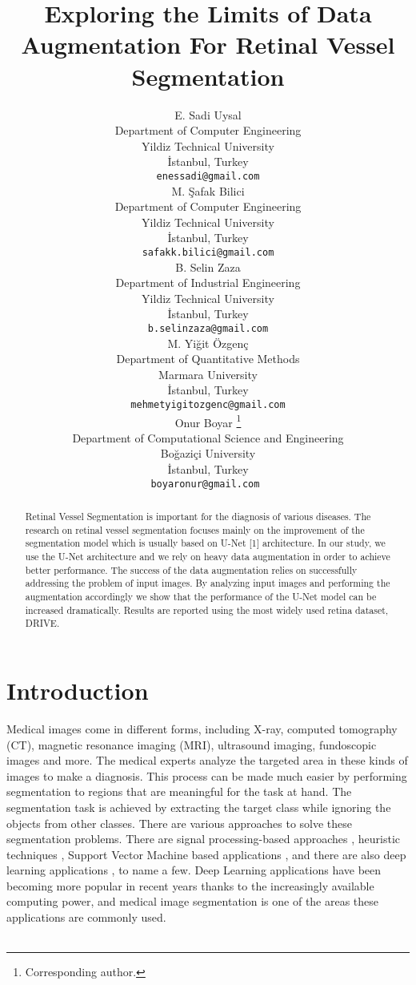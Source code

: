 \documentclass{article}
\title{Exploring the Limits of Data Augmentation For Retinal Vessel Segmentation}
\date{}
\author{ E. Sadi Uysal  \\
	Department of Computer Engineering\\
	Yildiz Technical University\\
	İstanbul, Turkey \\
	\texttt{enessadi@gmail.com} \\
	\And
	M. Şafak Bilici  \\
	Department of Computer Engineering\\
	Yildiz Technical University\\
	İstanbul, Turkey \\
	\texttt{safakk.bilici@gmail.com} \\
	\And
  B. Selin Zaza \\
  Department of Industrial Engineering\\
  Yildiz Technical University\\
  İstanbul, Turkey \\
  \texttt{b.selinzaza@gmail.com} \\  
  \And
  M. Yiğit Özgenç \\
  Department of Quantitative Methods\\
  Marmara University\\
  İstanbul, Turkey \\
  \texttt{mehmetyigitozgenc@gmail.com} \\
  \And
  Onur Boyar \thanks{Corresponding author.}\\
  Department of Computational Science and Engineering\\
  Boğaziçi University\\
  İstanbul, Turkey \\
  \texttt{boyaronur@gmail.com } \\
}
\begin{document}
\maketitle

\begin{abstract}
	Retinal Vessel Segmentation is important for the diagnosis of various diseases. The research on retinal vessel segmentation focuses mainly on the improvement of the segmentation model which is usually based on U-Net [1] architecture. In our study, we use the U-Net architecture and we rely on heavy data augmentation in order to achieve better performance. The success of the data augmentation relies on successfully addressing the problem of input images. By analyzing input images and performing the augmentation accordingly we show that the performance of the U-Net model can be increased dramatically. Results are reported using the most widely used retina dataset, DRIVE.
\end{abstract}





\section{Introduction}

Medical images come in different forms, including  X-ray, computed tomography (CT), magnetic resonance imaging (MRI), ultrasound imaging, fundoscopic images and more. The medical experts analyze the targeted area in  these kinds of images to make a diagnosis. This process can be made much easier by performing segmentation to regions that are meaningful for the task at hand. The segmentation task is achieved by extracting the target class while ignoring the objects from other classes. There are various approaches to solve these segmentation problems. There are signal processing-based approaches \cite{1677727}, heuristic techniques \cite{Nguyen2013AnER}, Support Vector Machine based applications \cite{4336179}, and there are also deep learning applications \cite{10.1007/978-3-319-46723-8_16, kamran2021rvgan}, to name a few. Deep Learning applications have been becoming more popular in recent years thanks to the increasingly available computing power, and medical image segmentation is one of the areas these applications are commonly used. 	\\\\
\end{document}
